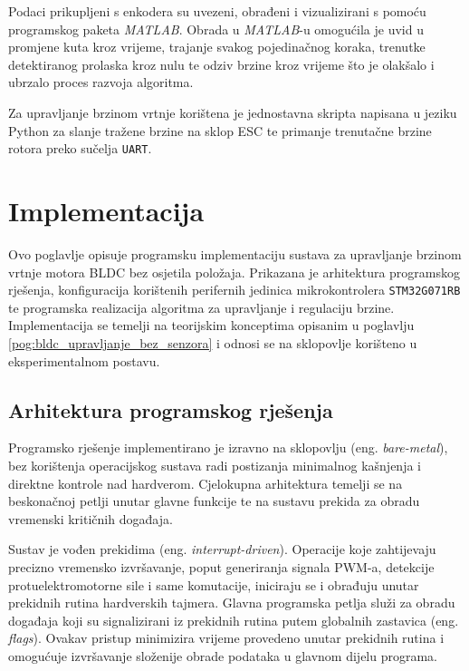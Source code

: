 \documentclass[diplomskirad]{fer}
\begin{document}
Podaci prikupljeni s enkodera su uvezeni, obrađeni i vizualizirani s pomoću
programskog paketa \textit{MATLAB}. Obrada u \textit{MATLAB}-u omogućila je
uvid u promjene kuta kroz vrijeme, trajanje svakog pojedinačnog koraka,
trenutke detektiranog prolaska kroz nulu te odziv brzine kroz vrijeme što je
olakšalo i ubrzalo proces razvoja algoritma.

Za upravljanje brzinom vrtnje korištena je jednostavna skripta napisana u
jeziku Python za slanje tražene brzine na sklop ESC te primanje trenutačne
brzine rotora preko sučelja \texttt{UART}.

\chapter{Implementacija}
\label{pog:implementacija}

Ovo poglavlje opisuje programsku implementaciju sustava za upravljanje brzinom
vrtnje motora BLDC bez osjetila položaja. Prikazana je arhitektura programskog
rješenja, konfiguracija korištenih perifernih jedinica mikrokontrolera
\texttt{STM32G071RB} te programska realizacija algoritma za upravljanje i
regulaciju brzine. Implementacija se temelji na teorijskim konceptima opisanim
u poglavlju \ref{pog:bldc_upravljanje_bez_senzora} i odnosi se na sklopovlje
korišteno u eksperimentalnom postavu.

\section{Arhitektura programskog rješenja}
\label{sec:arhitektura_rjesenja}

Programsko rješenje implementirano je izravno na sklopovlju (eng.
\textit{bare-metal}), bez korištenja operacijskog sustava radi postizanja
minimalnog kašnjenja i direktne kontrole nad hardverom. Cjelokupna arhitektura
temelji se na beskonačnoj petlji unutar glavne funkcije te na sustavu prekida
za obradu vremenski kritičnih događaja.

Sustav je vođen prekidima (eng. \textit{interrupt-driven}). Operacije koje
zahtijevaju precizno vremensko izvršavanje, poput generiranja signala PWM-a,
detekcije protuelektromotorne sile i same komutacije, iniciraju se i obrađuju
unutar prekidnih rutina hardverskih tajmera. Glavna programska petlja služi za
obradu događaja koji su signalizirani iz prekidnih rutina putem globalnih
zastavica (eng. \textit{flags}). Ovakav pristup minimizira vrijeme provedeno
unutar prekidnih rutina i omogućuje izvršavanje složenije obrade podataka u
glavnom dijelu programa.
\end{document}
